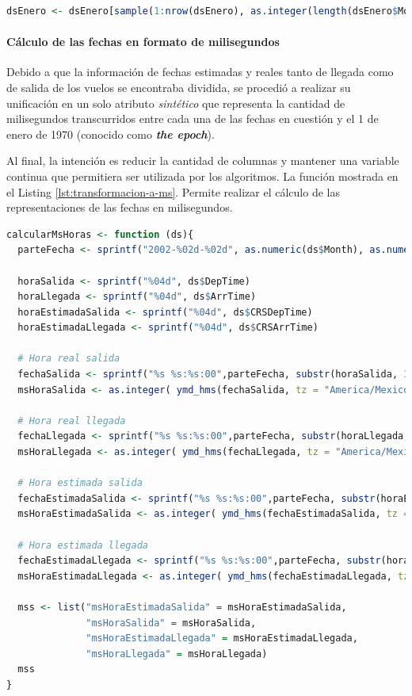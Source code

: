 \documentclass[12pt]{article}
\numberwithin{equation}{section}
\numberwithin{table}{section}
\numberwithin{figure}{section}
\begin{document}
\begin{lstlisting}[language=R, caption=Muestreo aleatorio de registros por mes, label={lst:muestreo-aleatorio}]
dsEnero <- dsEnero[sample(1:nrow(dsEnero), as.integer(length(dsEnero$Month) * tamanyoMuestra), replace=FALSE),]
\end{lstlisting}

\paragraph{Cálculo de las fechas en formato de milisegundos}
Debido a que la información de fechas estimadas y reales tanto de llegada como de salida de los vuelos se encontraba dividida, se procedió a realizar su unificación en un solo atributo \emph{sintético} que representa la cantidad de milisegundos transcurridos entre cada una de las fechas en cuestión y el 1 de enero de 1970 (conocido como \emph{\textbf{the epoch}}).

Al final, la intención es reducir la cantidad de columnas y mantener una variable continua que permitiera ser utilizada por los algoritmos. La función mostrada en el Listing \ref{lst:transformacion-a-ms}.
Permite realizar el cálculo de las representaciones de las fechas en milisegundos. 

\begin{lstlisting}[language=R, caption=Transformación de las horas (timestamps) a milisegundos, label={lst:transformacion-a-ms}]
calcularMsHoras <- function (ds){
  parteFecha <- sprintf("2002-%02d-%02d", as.numeric(ds$Month), as.numeric(ds$DayofMonth))
  
  horaSalida <- sprintf("%04d", ds$DepTime)
  horaLlegada <- sprintf("%04d", ds$ArrTime)
  horaEstimadaSalida <- sprintf("%04d", ds$CRSDepTime)
  horaEstimadaLlegada <- sprintf("%04d", ds$CRSArrTime)
  
  # Hora real salida
  fechaSalida <- sprintf("%s %s:%s:00",parteFecha, substr(horaSalida, 1, 2), substr(horaSalida, 3, 4))
  msHoraSalida <- as.integer( ymd_hms(fechaSalida, tz = "America/Mexico_City"))
  
  # Hora real llegada
  fechaLlegada <- sprintf("%s %s:%s:00",parteFecha, substr(horaLlegada, 1, 2), substr(horaLlegada, 3, 4))
  msHoraLlegada <- as.integer( ymd_hms(fechaLlegada, tz = "America/Mexico_City"))
  
  # Hora estimada salida
  fechaEstimadaSalida <- sprintf("%s %s:%s:00",parteFecha, substr(horaEstimadaSalida, 1, 2), substr(horaEstimadaSalida, 3, 4))
  msHoraEstimadaSalida <- as.integer( ymd_hms(fechaEstimadaSalida, tz = "America/Mexico_City"))
  
  # Hora estimada llegada
  fechaEstimadaLlegada <- sprintf("%s %s:%s:00",parteFecha, substr(horaEstimadaLlegada, 1, 2), substr(horaEstimadaLlegada, 3, 4))
  msHoraEstimadaLlegada <- as.integer( ymd_hms(fechaEstimadaLlegada, tz = "America/Mexico_City"))
  
  mss <- list("msHoraEstimadaSalida" = msHoraEstimadaSalida,
              "msHoraSalida" = msHoraSalida,
              "msHoraEstimadaLlegada" = msHoraEstimadaLlegada,
              "msHoraLlegada" = msHoraLlegada)
  mss
}
\end{lstlisting}
\end{document}
